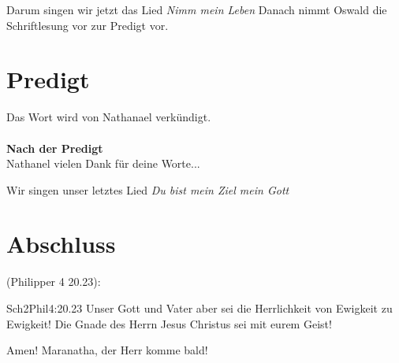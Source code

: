Darum singen wir jetzt das Lied \textit{Nimm mein Leben}
Danach nimmt Oswald die Schriftlesung vor zur Predigt vor.

\section{Predigt}
Das Wort wird von Nathanael verkündigt.
\\
\\
\textbf{Nach der Predigt}\\
Nathanel vielen Dank für deine Worte...

Wir singen unser letztes Lied \textit{Du bist mein Ziel mein Gott}

\section{Abschluss}
(Philipper 4 20.23):
\begin{bibeltext}{Sch2}{Phil}{4:20.23}
Unser Gott und Vater aber sei die Herrlichkeit von Ewigkeit zu Ewigkeit!
Die Gnade des Herrn Jesus Christus sei mit eurem Geist!
\end{bibeltext}
Amen! Maranatha, der Herr komme bald!
